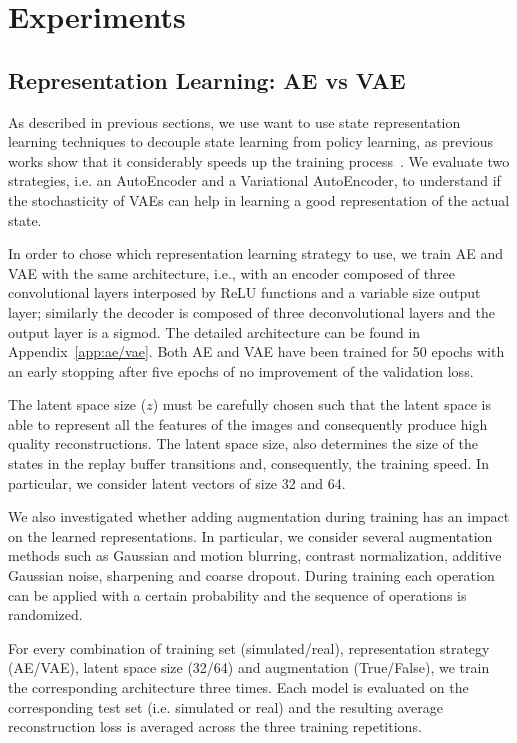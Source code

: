 \chapter{Experiments}

\section{Representation Learning: AE vs VAE}

As described in previous sections, we use want to use state representation learning techniques to decouple state learning from policy learning, as previous works show that it considerably speeds up the training process~\cite{DBLP:journals/corr/abs-2008-00715,DBLP:journals/corr/abs-1910-01741}. We evaluate two strategies, i.e. an AutoEncoder and a Variational AutoEncoder, to understand if the stochasticity of VAEs can help in learning a good representation of the actual state. 

In order to chose which representation learning strategy to use, we train AE and VAE with the same architecture, i.e., with an encoder composed of three  convolutional layers interposed by ReLU functions and a variable size output layer; similarly the decoder is composed of three deconvolutional layers and the output layer is a sigmod. The detailed architecture can be found in Appendix~\ref{app:ae/vae}. Both AE and VAE have been trained for 50 epochs with an early stopping after five epochs of no improvement of the validation loss.

The latent space size ($z$) must be carefully chosen such that the latent space is able to represent all the features of the images and consequently produce high quality reconstructions. The latent space size, also determines the size of the states in the replay buffer transitions and, consequently, the training speed. In particular, we consider latent vectors of size 32 and 64.

We also investigated whether adding augmentation during training has an impact on the learned representations. In particular, we consider several augmentation methods such as Gaussian and motion blurring, contrast normalization, additive Gaussian noise, sharpening and coarse dropout. During training each operation can be applied with a certain probability and the sequence of operations is randomized.

For every combination of training set (simulated/real), representation strategy (AE/VAE), latent space size (32/64) and augmentation (True/False), we train the corresponding architecture three times. Each model is evaluated on the corresponding test set (i.e. simulated or real) and the resulting average reconstruction loss is averaged across the three training repetitions.

